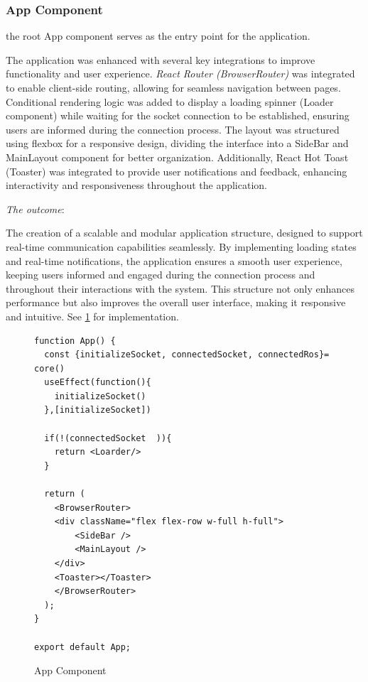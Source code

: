 \documentclass[a4paper,12pt]{extreport}
\begin{document}
\subsubsection{App Component}

the root App component serves as the entry point for the application.

The application was enhanced with several key integrations to improve
functionality and user experience. \emph{React Router (BrowserRouter)}
was integrated to enable client-side routing, allowing for seamless
navigation between pages. Conditional rendering logic was added to
display a loading spinner (Loader component) while waiting for the
socket connection to be established, ensuring users are informed during
the connection process. The layout was structured using flexbox for a
responsive design, dividing the interface into a SideBar and MainLayout
component for better organization. Additionally, React Hot Toast
(Toaster) was integrated to provide user notifications and feedback,
enhancing interactivity and responsiveness throughout the application.

\emph{The outcome}:

The creation of a scalable and modular application structure, designed
to support real-time communication capabilities seamlessly. By
implementing loading states and real-time notifications, the application
ensures a smooth user experience, keeping users informed and engaged
during the connection process and throughout their interactions with the
system. This structure not only enhances performance but also improves
the overall user interface, making it responsive and intuitive. See
\cref{judFig9} for implementation.

\begin{figure}[h!]
  \begin{verbatim}
function App() {
  const {initializeSocket, connectedSocket, connectedRos}= core()
  useEffect(function(){
    initializeSocket()
  },[initializeSocket])

  if(!(connectedSocket  )){
    return <Loarder/>
  }

  return (
    <BrowserRouter>
    <div className="flex flex-row w-full h-full">
        <SideBar />
        <MainLayout />
    </div>
    <Toaster></Toaster>
    </BrowserRouter>
  );
}

export default App;

\end{verbatim}
\caption{App Component}
\label{judFig9}
\end{figure}
\end{document}
